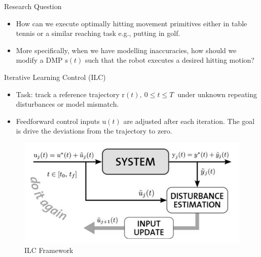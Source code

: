 \documentclass[handout]{beamer}
\newcommand{\boldvec}[1]{\boldsymbol{\mathrm{#1}}}
\let\vec\boldvec
\newcommand{\dmp}{\vec{s}} %
\newcommand{\traj}{\vec{r}} %
\newcommand{\sysInput}{\vec{u}} %
\begin{document}
%
\begin{frame}{Research Question}
\begin{itemize}
\item How can we execute optimally hitting movement primitives either in table tennis or a similar reaching task e.g., putting in golf. 
%
\item More specifically, when we have modelling inaccuracies, how should we modify a DMP $\dmp(t)$ such that the robot executes a desired hitting motion?
\end{itemize}
\end{frame}
%
\begin{frame}{Iterative Learning Control (ILC)}
\begin{itemize}
\item Task: track a reference trajectory $\traj(t), \ 0 \leq t \leq T \ $ under unknown repeating disturbances or model mismatch.
\item Feedforward control inputs $\sysInput(t)$ are adjusted after each iteration. The goal is drive the deviations from the trajectory to zero. 
\end{itemize}
\begin{figure}
\center
\includegraphics[scale=0.25]{ilc_framework}			
\caption{ILC Framework}
\end{figure}
\end{frame}
%
%
\end{document}
